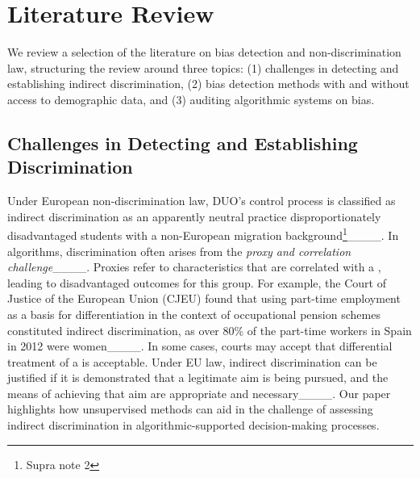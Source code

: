 \section{Literature Review}
\label{sec:lit}
We review a selection of the literature on bias detection and non-discrimination law, structuring the review around three topics: (1) challenges in detecting and establishing indirect discrimination, (2) bias detection methods with and without access to demographic data, and (3) auditing algorithmic systems on bias.

\subsection{Challenges in Detecting and Establishing Discrimination}

Under European non-discrimination law, DUO's control process is classified as indirect discrimination as an apparently neutral practice disproportionately disadvantaged students with a non-European migration background\footnote{Supra note 2}____. In algorithms, discrimination often arises from the \emph{proxy and correlation challenge}____. Proxies refer to characteristics that are correlated with a {\protectedgroup}, leading to disadvantaged outcomes for this group. For example, the Court of Justice of the European Union (CJEU) found that using part-time employment as a basis for differentiation in the context of occupational pension schemes constituted indirect discrimination, as over 80\% of the part-time workers in Spain in 2012 were women____. 
In some cases, courts may accept that differential treatment of a {\protectedgroup} is acceptable. Under EU law, indirect discrimination can be justified if it is demonstrated that a legitimate aim is being pursued, and the means of achieving that aim are appropriate and necessary____. Our paper highlights how unsupervised methods can aid in the challenge of assessing indirect discrimination in algorithmic-supported decision-making processes.

